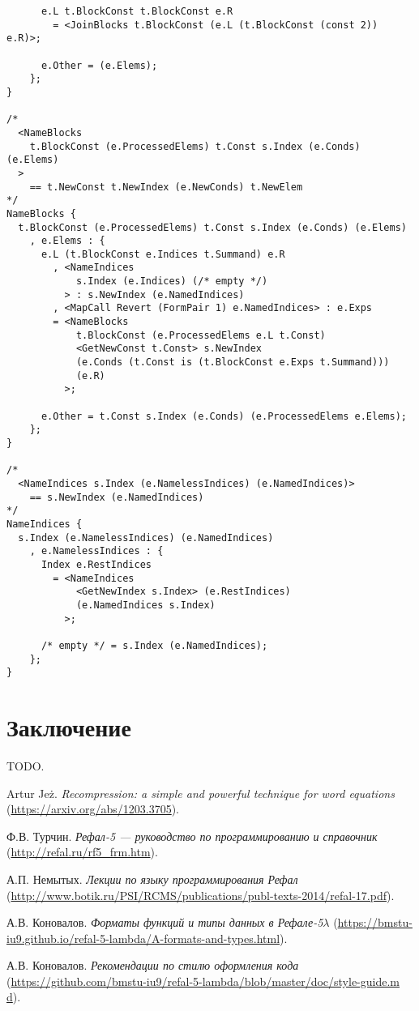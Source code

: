 \documentclass[12pt]{article}
\begin{document}
\begin{verbatim}
      e.L t.BlockConst t.BlockConst e.R
        = <JoinBlocks t.BlockConst (e.L (t.BlockConst (const 2)) e.R)>;

      e.Other = (e.Elems);
    };
}

/*
  <NameBlocks
    t.BlockConst (e.ProcessedElems) t.Const s.Index (e.Conds) (e.Elems)
  >
    == t.NewConst t.NewIndex (e.NewConds) t.NewElem
*/
NameBlocks {
  t.BlockConst (e.ProcessedElems) t.Const s.Index (e.Conds) (e.Elems)
    , e.Elems : {
      e.L (t.BlockConst e.Indices t.Summand) e.R
        , <NameIndices
            s.Index (e.Indices) (/* empty */)
          > : s.NewIndex (e.NamedIndices)
        , <MapCall Revert (FormPair 1) e.NamedIndices> : e.Exps
        = <NameBlocks
            t.BlockConst (e.ProcessedElems e.L t.Const)
            <GetNewConst t.Const> s.NewIndex
            (e.Conds (t.Const is (t.BlockConst e.Exps t.Summand)))
            (e.R)
          >;
          
      e.Other = t.Const s.Index (e.Conds) (e.ProcessedElems e.Elems);
    };
}

/*
  <NameIndices s.Index (e.NamelessIndices) (e.NamedIndices)>
    == s.NewIndex (e.NamedIndices)
*/
NameIndices {
  s.Index (e.NamelessIndices) (e.NamedIndices)
    , e.NamelessIndices : {
      Index e.RestIndices
        = <NameIndices
            <GetNewIndex s.Index> (e.RestIndices)
            (e.NamedIndices s.Index)
          >;

      /* empty */ = s.Index (e.NamedIndices);
    };
}
\end{verbatim}

\section{Заключение}

TODO.

\begin{thebibliography}{9}
Artur Jeż. \emph{Recompression: a simple and powerful technique for word
equations} (\url{https://arxiv.org/abs/1203.3705}).

Ф.В. Турчин. \emph{Рефал-5 --- руководство по программированию и справочник}
(\url{http://refal.ru/rf5_frm.htm}).

А.П. Немытых. \emph{Лекции по языку программирования Рефал}
(\url{http://www.botik.ru/PSI/RCMS/publications/publ-texts-2014/refal-17.pdf}).

А.В. Коновалов. \emph{Форматы функций и типы данных в Рефале-5$\lambda$}
(\url{https://bmstu-iu9.github.io/refal-5-lambda/A-formats-and-types.html}).
  
А.В. Коновалов. \emph{Рекомендации по стилю оформления кода}
(\url{https://github.com/bmstu-iu9/refal-5-lambda/blob/master/doc/style-guide.m
d}).
  
\end{thebibliography}
\end{document}
